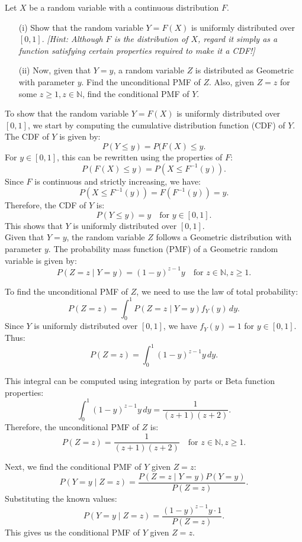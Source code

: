 \begin{exercise}
Let \( X \) be a random variable with a continuous distribution \( F \).
\begin{enumerate}
    \item[(i)] Show that the random variable \( Y = F(X) \) is uniformly distributed over \( [0, 1] \). \textit{[Hint: Although \( F \) is the distribution of \( X \), regard it simply as a function satisfying certain properties required to make it a CDF!]}
    \item[(ii)] Now, given that \( Y = y \), a random variable \( Z \) is distributed as Geometric with parameter \( y \). Find the unconditional PMF of \( Z \). Also, given \( Z = z \) for some \( z \geq 1, z \in \mathbb{N} \), find the conditional PMF of \( Y \).
\end{enumerate}
\end{exercise}

\begin{solution}
To show that the random variable \( Y = F(X) \) is uniformly distributed over \( [0, 1] \), we start by computing the cumulative distribution function (CDF) of \( Y \). \\

The CDF of \( Y \) is given by:
\[
P(Y \leq y) = P(F(X) \leq y.
\]
For \( y \in [0, 1] \), this can be rewritten using the properties of \( F \):
\[
P(F(X) \leq y) = P(X \leq F^{-1}(y)).
\]
Since \( F \) is continuous and strictly increasing, we have:
\[
P(X \leq F^{-1}(y)) = F(F^{-1}(y)) = y.
\]
Therefore, the CDF of \( Y \) is:
\[
P(Y \leq y) = y \quad \text{for } y \in [0, 1].
\]
This shows that \( Y \) is uniformly distributed over \( [0, 1] \).\\

Given that \( Y = y \), the random variable \( Z \) follows a Geometric distribution with parameter \( y \). The probability mass function (PMF) of a Geometric random variable is given by:
\[
P(Z = z \mid Y = y) = (1 - y)^{z-1} y \quad \text{for } z \in \mathbb{N}, z \geq 1.
\]

To find the unconditional PMF of \( Z \), we need to use the law of total probability:
\[
P(Z = z) = \int_0^1 P(Z = z \mid Y = y) f_Y(y) \, dy.
\]
Since \( Y \) is uniformly distributed over \( [0, 1] \), we have \( f_Y(y) = 1 \) for \( y \in [0, 1] \). Thus:
\[
P(Z = z) = \int_0^1 (1 - y)^{z-1} y \, dy.
\]

This integral can be computed using integration by parts or Beta function properties:
\[
\int_0^1 (1 - y)^{z-1} y \, dy = \frac{1}{(z+1)(z+2)}.
\]
Therefore, the unconditional PMF of \( Z \) is:
\[
P(Z = z) = \frac{1}{(z+1)(z+2)} \quad \text{for } z \in \mathbb{N}, z \geq 1.
\]

Next, we find the conditional PMF of \( Y \) given \( Z = z \):
\[
P(Y = y \mid Z = z) = \frac{P(Z = z \mid Y = y) P(Y = y)}{P(Z = z)}.
\]
Substituting the known values:
\[
P(Y = y \mid Z = z) = \frac{(1 - y)^{z-1} y \cdot 1}{P(Z = z)}.
\]
This gives us the conditional PMF of \( Y \) given \( Z = z \).

\end{solution}

